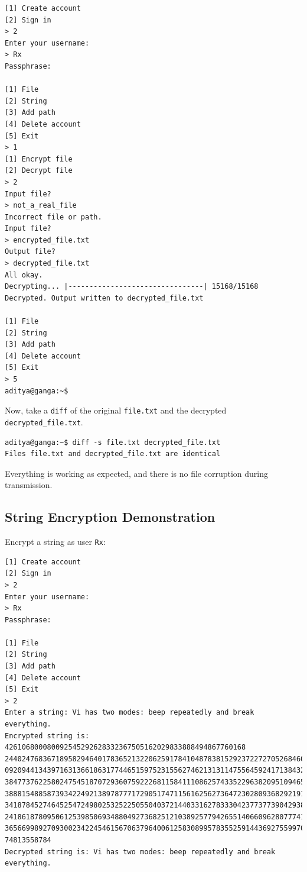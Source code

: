\documentclass[twoside]{article}
\begin{document}
\begin{verbatim}
[1] Create account
[2] Sign in
> 2
Enter your username:
> Rx
Passphrase:

[1] File
[2] String
[3] Add path
[4] Delete account
[5] Exit
> 1
[1] Encrypt file
[2] Decrypt file
> 2
Input file?
> not_a_real_file
Incorrect file or path.
Input file?
> encrypted_file.txt
Output file?
> decrypted_file.txt
All okay.
Decrypting... |--------------------------------| 15168/15168
Decrypted. Output written to decrypted_file.txt

[1] File
[2] String
[3] Add path
[4] Delete account
[5] Exit
> 5
aditya@ganga:~$
\end{verbatim}
Now, take a \texttt{diff} of the original \texttt{file.txt} and the decrypted \texttt{decrypted\_file.txt}.

\begin{verbatim}
aditya@ganga:~$ diff -s file.txt decrypted_file.txt
Files file.txt and decrypted_file.txt are identical
\end{verbatim}
Everything is working as expected, and there is no file corruption during transmission.


\subsection{String Encryption Demonstration}
Encrypt a string as user \texttt{Rx}:

\begin{verbatim}
[1] Create account
[2] Sign in
> 2
Enter your username:
> Rx
Passphrase:

[1] File
[2] String
[3] Add path
[4] Delete account
[5] Exit
> 2
Enter a string: Vi has two modes: beep repeatedly and break everything.
Encrypted string is: 426106800080092545292628332367505162029833888494867760168
244024768367189582946401783652132206259178410487838152923722727052684609932933
092094413439716313661863177446515975231556274621313114755645924171384324293295
384773762258024754518707293607592226811584111086257433522963820951094653987274
388815488587393422492138978777172905174711561625627364723028093682921917085995
341878452746452547249802532522505504037214403316278333042377377390429389015262
241861878095061253985069348804927368251210389257794265514066096280777415593309
365669989270930023422454615670637964006125830899578355259144369275599709533166
74813558784
Decrypted string is: Vi has two modes: beep repeatedly and break everything.
\end{verbatim}
\end{document}
